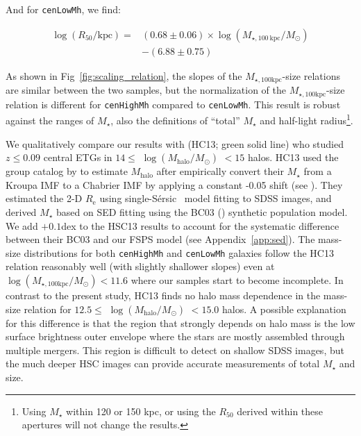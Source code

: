 \documentclass[a4paper,fleqn,usenatbib]{mnras}
\def\ser{{S\'{e}rsic\ }}
\def\rbcg{\texttt{cenHighMh}}
\def\nbcg{\texttt{cenLowMh}}
\def\mstar{{$M_{\star}$}}
\def\mhalo{{$M_{\mathrm{halo}}$}}
\def\logmh{{$\log (M_{\mathrm{halo}}/M_{\odot})$}}
\def\mtot{{$M_{\star,100\mathrm{kpc}}$}}
\def\logmtot{{$\log (M_{\star,100\mathrm{kpc}}/M_{\odot})$}}
\begin{document}
    \noindent And for \nbcg{}, we find:
    
    \begin{equation}
        \begin{aligned}
        \log (R_{\mathrm{50}}/\mathrm{kpc}) = & (0.68\pm0.06) \times \log (M_{\star, 100\ \mathrm{kpc}}/M_{\odot}) \\ & -(6.88\pm0.75)
        \end{aligned}
    \end{equation}
    
    \noindent As shown in Fig~\ref{fig:scaling_relation}, the slopes of the \mtot{}-size 
    relations are similar between the two samples, but the normalization of the 
    \mtot{}-size relation is different for \rbcg{} compared to \nbcg{}. 
    This result is robust against the ranges of \mstar{}, also the definitions of 
    ``total'' \mstar{} and  half-light radius\footnote{Using \mstar{} within 120 or 150 
    kpc, or using the $R_{\mathrm{50}}$ derived within these apertures will not change 
    the results.}.
    
    We qualitatively compare our results with \citealt{HCompany13} (HC13; green solid line) 
    who studied $z\leq 0.09$ central ETGs in  $14\le$ \logmh{} $<15$ halos. 
    HC13 used the group catalog by \citet{Yang2007} to estimate \mhalo{} after empirically 
    convert their \mstar{} from a Kroupa IMF to a Chabrier IMF by applying a constant 
    -0.05 shift (see \citealt{Bernardi2016}).
    They estimated the 2-D $R_{\mathrm{e}}$ using single-\ser{} model fitting to SDSS 
    images, and derived \mstar{} based on SED fitting using the BC03 (\citealt{BC03}) 
    synthetic population model. 
    We add $+0.1$dex to the HSC13 results to account for the systematic 
    difference between their BC03 and our FSPS model (see Appendix~\ref{app:sed}). 
    The mass-size distributions for both \rbcg{} and \nbcg{} galaxies follow the 
    HC13 relation reasonably well (with slightly shallower slopes) even at 
    \logmtot{}$< 11.6$ where our samples start to become incomplete. 
    In contrast to the present study, HC13 finds no halo mass dependence in the 
    mass-size relation for $12.5\le$ \logmh{} $<15.0$ halos.
    A possible explanation for this difference is that the region that strongly depends 
    on halo mass is the low surface brightness outer envelope where the stars are 
    mostly assembled through multiple mergers. 
    This region is difficult to detect on shallow SDSS images, but the much deeper 
    HSC images can provide accurate measurements of total \mstar{} and size. 
     
\end{document}
